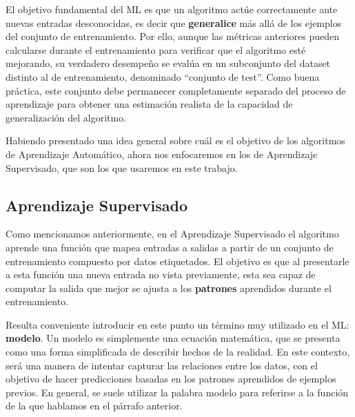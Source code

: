 \documentclass[../../main.tex]{subfiles}
\begin{document}
El objetivo fundamental del ML es que un algoritmo actúe correctamente ante nuevas
entradas desconocidas, es decir que \textbf{generalice} más allá de los ejemplos del
conjunto de entrenamiento. Por ello, aunque las métricas anteriores pueden calcularse
durante el entrenamiento para verificar que el algoritmo esté mejorando, su verdadero
desempeño se evalúa en un subconjunto del dataset distinto al de entrenamiento, denominado
``conjunto de test''. Como buena práctica, este conjunto debe permanecer completamente
separado del proceso de aprendizaje para obtener una estimación realista de la capacidad
de generalización del algoritmo.

\bigskip
Habiendo presentado una idea general sobre cuál es el objetivo de los algoritmos de
Aprendizaje Automático, ahora nos enfocaremos en los de Aprendizaje Supervisado, que son
los que usaremos en este trabajo.

\subsection{Aprendizaje Supervisado}
Como mencionamos anteriormente, en el Aprendizaje Supervisado el algoritmo aprende una
función que mapea entradas a salidas a partir de un conjunto de entrenamiento compuesto
por datos etiquetados. El objetivo es que al presentarle a esta función una nueva entrada
no vista previamente, esta sea capaz de computar la salida que mejor se ajusta a los
\textbf{patrones} aprendidos durante el entrenamiento.

Resulta conveniente introducir en este punto un término muy utilizado en el ML:
\textbf{modelo}. Un modelo es simplemente una ecuación matemática, que se presenta como
una forma simplificada de describir hechos de la realidad. En este contexto, será una
manera de intentar capturar las relaciones entre los datos, con el objetivo de hacer
predicciones basadas en los patrones aprendidos de ejemplos previos. En general, se suele
utilizar la palabra modelo para referirse a la función de la que hablamos en el párrafo
anterior.
\end{document}
